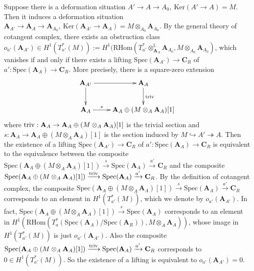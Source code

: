 \documentclass[10pt]{article}
\numberwithin{equation}{section}
\newcommand{\bL}{{\mathbb L}}
\newcommand{\Ker}{{\mathrm{Ker}}}           %
\newcommand{\Spec}{{\mathrm{Spec}}}         %
\newcommand{\bfA}{{\textbf{A}}}
\newcommand{\bfC}{{\textbf{C}}}
\newcommand{\RHom}{{\mathrm{RHom}}}
\begin{document}
Suppose there is a deformation situation $A'\to A\to A_0, \ \Ker(A'\to A)=M$. Then it induces a deformation situation $\bfA_{A'}\to \bfA_A\to \bfA_{A_0}, \ \Ker(\bfA_{A'}\to \bfA_A)=M\otimes_{A_0}\bfA_{A_0}$. By the general theory of cotangent complex, there exists an obstruction class $o_{a'}(\bfA_{A'})\in H^1(T^*_{a'}(M)):=H^1(\RHom(T^*_{a'}\otimes^{\bL}_{\bfA_A}\bfA_{A_0},M\otimes_{A_0}\bfA_{A_0})$, which vanishes if and only if there exists a lifting $\Spec(\bfA_{A'})\to \bfC_R$ of $a':\Spec(\bfA_A)\to \bfC_R$. More precisely, there is a square-zero extension
\begin{equation}\label{square-zero-ext}
    \xymatrix{
    \bfA_{A'}\ar[r]\ar[d]&\bfA_{A}\ar[d]^{\rm triv}\\
    \bfA_A\ar[r]^-{s}& \bfA_A\oplus (M\otimes_{A}\bfA_A)[1]
    }
\end{equation}
where ${\rm triv}:\bfA_A\to \bfA_A\oplus (M\otimes_{A}\bfA_A)[1]$ is the trivial section and $s:\bfA_A\to \bfA_A\oplus (M\otimes_{A}\bfA_A)[1]$ is the section induced by $M\hookrightarrow A'\twoheadrightarrow A$. Then the existence of a lifting $\Spec(\bfA_{A'})\to \bfC_R$ of $a':\Spec(\bfA_A)\to \bfC_R$ is equivalent to the equivalence between the composite $\Spec(\bfA_A\oplus (M\otimes_{A}\bfA_A)[1])\xrightarrow{s}\Spec(\bfA_A)\xrightarrow{a'}\bfC_R$ and the composite $\Spec(\bfA_A\oplus (M\otimes_{A}\bfA_A)[1])\xrightarrow{\rm triv}\Spec(\bfA_A)\xrightarrow{a'}\bfC_R$. By the definition of cotangent complex, the composite $\Spec(\bfA_A\oplus (M\otimes_{A}\bfA_A)[1])\xrightarrow{s}\Spec(\bfA_A)\xrightarrow{a'}\bfC_R$ corresponds to an element in $H^1(T^*_{a'}(M))$, which we denote by $o_{a'}(\bfA_{A'})$. In fact, $\Spec(\bfA_A\oplus (M\otimes_{A}\bfA_A)[1])\xrightarrow{s}\Spec(\bfA_A)$ corresponds to an element in $H^1(\RHom(T^*_a(\Spec(\bfA_A)/\Spec(\bfA_R)),M\otimes_{A}\bfA_A))$, whose image in $H^1(T^*_{a'}(M))$ is just  $o_{a'}(\bfA_{A'})$. Also the composite $\Spec(\bfA_A\oplus (M\otimes_{A}\bfA_A)[1])\xrightarrow{\rm triv}\Spec(\bfA_A)\xrightarrow{a'}\bfC_R$ corresponds to $0\in H^1(T^*_{a'}(M))$. So the existence of a lifting is equivalent to $o_{a'}(\bfA_{A'})=0$.
\end{document}
